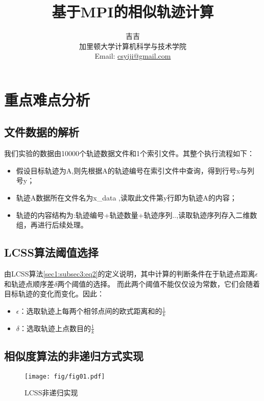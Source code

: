 \documentclass[UTF8]{ctexart}
\title{\huge{\heiti 基于MPI的相似轨迹计算}}
\author{\small{\kaishu 吉吉}\\[2pt]
\small{\kaishu 加里顿大学计算机科学与技术学院}\\[2pt]
\small{Email:}
\url{csyiji@gmail.com}
}
\date{} %
\begin{document}
\maketitle


\section{重点难点分析}\label{sec2}
\subsection{文件数据的解析}

我们实验的数据由10000个轨迹数据文件和1个索引文件。其整个执行流程如下：

\begin{itemize}
	\item 假设目标轨迹为A,则先根据A的轨迹编号在索引文件中查询，得到行号x与列号y；
	\item 轨迹A数据所在文件名为x\_data ,读取此文件第y行即为轨迹A的内容；
	\item 轨迹的内容结构为:轨迹编号+轨迹数量+轨迹序列..,读取轨迹序列存入二维数组，再进行后续处理。
\end{itemize}

\subsection{LCSS算法阈值选择}

由LCSS算法\ref{sec1:subsec3:eq2}的定义说明，其中计算的判断条件在于轨迹点距离$\epsilon$和轨迹点顺序差$\delta$两个阈值的选择。
而此两个阈值不能仅仅设为常数，它们会随着目标轨迹的变化而变化。因此：

\begin{itemize}
	\item $\epsilon$：选取轨迹上每两个相邻点间的欧式距离和的$\frac{1}{k}$
	\item $\delta$：选取轨迹上点数目的$\frac{1}{k}$
\end{itemize}

\subsection{相似度算法的非递归方式实现}
\label{sec2:subsec3}

\begin{figure}[!htbp]
  \centering
  \texttt{[image: fig/fig01.pdf]}\\
  \caption{LCSS非递归实现}
  \label{sec2:subsec3:fg1}
\end{figure}
\end{document}
